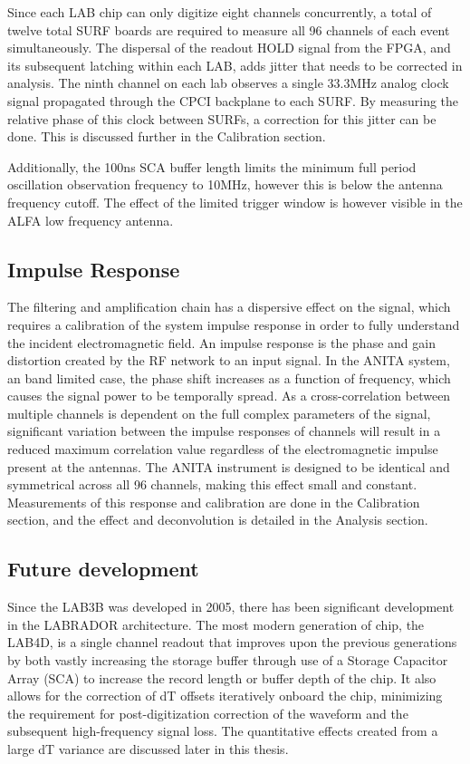  	Since each LAB chip can only digitize eight channels concurrently, a total of twelve total SURF boards are required to measure all 96 channels of each event simultaneously.  The dispersal of the readout HOLD signal from the FPGA, and its subsequent latching within each LAB, adds jitter that needs to be corrected in analysis.  The ninth channel on each lab observes a single 33.3MHz analog clock signal propagated through the CPCI backplane to each SURF.  By measuring the relative phase of this clock between SURFs, a correction for this jitter can be done.  This is discussed further in the Calibration section.
 	
 	 Additionally, the 100ns SCA buffer length  limits the minimum full period oscillation observation frequency to 10MHz, however this is below the antenna frequency cutoff.  The effect of the limited trigger window is however visible in the ALFA low frequency antenna.
	
	\subsection{Impulse Response}
	The filtering and amplification chain has a dispersive effect on the signal, which requires a calibration of the system impulse response in order to fully understand the incident electromagnetic field.  An impulse response is the phase and gain distortion created by the RF network to an input signal.  In the ANITA system, an band limited case, the phase shift increases as a function of frequency, which causes the signal power to be temporally spread.  As a cross-correlation between multiple channels is dependent on the full complex parameters of the signal, significant variation between the impulse responses of channels will result in a reduced maximum correlation value regardless of the electromagnetic impulse present at the antennas.  The ANITA instrument is designed to be identical and symmetrical across all 96 channels, making this effect small and constant.  Measurements of this response and calibration are done in the Calibration section, and the effect and deconvolution is detailed in the Analysis section.

	
	\subsection{Future development}
	Since the LAB3B was developed in 2005, there has been significant development in the LABRADOR architecture.  The most modern generation of chip, the LAB4D, is a single channel readout that improves upon the previous generations by both vastly increasing the storage buffer through use of a Storage Capacitor Array (SCA) to increase the record length or buffer depth of the chip.  It also allows for the correction of dT offsets iteratively onboard the chip, minimizing the requirement for post-digitization correction of the waveform and the subsequent high-frequency signal loss.  The quantitative effects created from a large dT variance are discussed later in this thesis.
	
